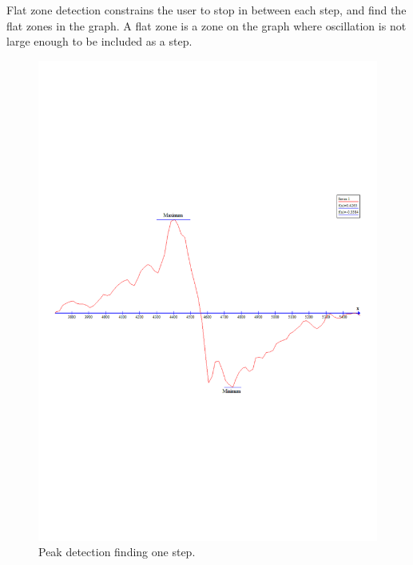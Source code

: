 Flat zone detection constrains the user to stop in between each step, and find the flat zones in the graph.
A flat zone is a zone on the graph where oscillation is not large enough to be included as a step.
\begin{figure}[H]
\centering
\includegraphics[trim=0 8cm 0cm 8cm, clip,scale=0.5]{media/peak-detection}
\caption{Peak detection finding one step.}
\label{figure:peak-detection}
\end{figure}


